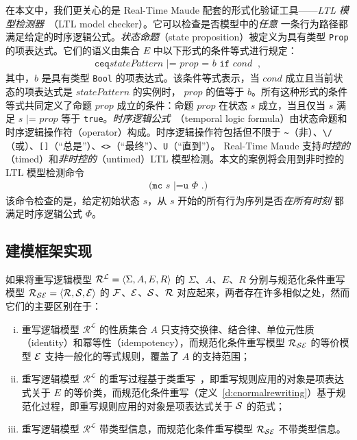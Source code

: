 在本文中，我们更关心的是 Real-Time Maude 配套的形式化验证工具——\emph{LTL 模型检测器}~\cite{DBLP:journals/entcs/EkerMS02}（LTL model checker）。它可以检查是否模型中的\emph{任意} 一条行为路径都满足给定的时序逻辑公式。\emph{状态命题}（state proposition）被定义为具有类型 \verb|Prop| 的项表达式。它们的语义由集合 $\mathit{E}$ 中以下形式的条件等式进行规定：
\begin{eqnarray}
\texttt{ceq
} \mathit{statePattern} \texttt{ |= } \mathit{prop} \texttt{ = } b
\texttt{ if } cond\;\; , \nonumber
\end{eqnarray}
其中，$b$ 是具有类型 \verb|Bool| 的项表达式。该条件等式表示，当 $cond$ 成立且当前状态的项表达式是 $\mathit{statePattern}$ 的实例时， $\mathit{prop}$ 的值等于 $b$。所有这种形式的条件等式共同定义了命题 $\mathit{prop}$ 成立的条件：命题 $\mathit{prop}$ 在状态 $s$ 成立，当且仅当 $s$ 满足 $s \texttt{ |= } \mathit{prop}$ 等于 \verb|true|。\emph{时序逻辑公式}~\cite{DBLP:books/daglib/0077033}（temporal logic formula）由状态命题和时序逻辑操作符（operator）构成。时序逻辑操作符包括但不限于 \verb|~|（非）、\verb|\/|（或）、\verb|[]|（“总是”）、\verb|<>|（“最终”）、\verb|U|（“直到”）。 Real-Time Maude 支持\emph{时控的}（timed）和\emph{非时控的}（untimed）LTL 模型检测。本文的案例将会用到非时控的 LTL 模型检测命令
\begin{eqnarray}
  \texttt{(mc } s \texttt{ |=u } \Phi \texttt{ .)} \nonumber
\end{eqnarray}
该命令检查的是，给定初始状态 $s$，从 $s$ 开始的所有行为序列是否\emph{在所有时刻} 都满足时序逻辑公式 $\Phi$。


\subsection{建模框架实现} 
\label{ss:method-impl}

如果将重写逻辑模型 $\mathcal{R^L} = \langle \Sigma, A, E, R\rangle$ 的 $\Sigma$、$A$、$E$、$R$ 分别与规范化条件重写模型 $\mathcal{R}_{\mathcal{S}\mathcal{E}} = \langle \mathcal{R},\mathcal{S},\mathcal{E}\rangle$ 的 $\mathcal{F}$、$\mathcal{E}$、$\mathcal{S}$、$\mathcal{R}$ 对应起来，两者存在许多相似之处，然而它们的主要区别在于：
\begin{enumerate}[(i)]
\item 重写逻辑模型 $\mathcal{R^L}$ 的性质集合 $A$ 只支持交换律、结合律、单位元性质（identity）和幂等性（idempotency），而规范化条件重写模型 $\mathcal{R}_{\mathcal{S}\mathcal{E}}$ 的等价模型 $\mathcal{E}$ 支持一般化的等式规则，覆盖了 $A$ 的支持范围；
\item 重写逻辑模型 $\mathcal{R^L}$ 的重写过程基于类重写~\cite{lankford77b}，即重写规则应用的对象是项表达式关于 $E$ 的等价类，而规范化条件重写（定义~\ref{d:cnormalrewriting}）基于规范化过程，即重写规则应用的对象是项表达式关于 $\mathcal{S}$ 的范式；
\item 重写逻辑模型 $\mathcal{R^L}$ 带类型信息，而规范化条件重写模型 $\mathcal{R}_{\mathcal{S}\mathcal{E}}$ 不带类型信息。
\end{enumerate}

